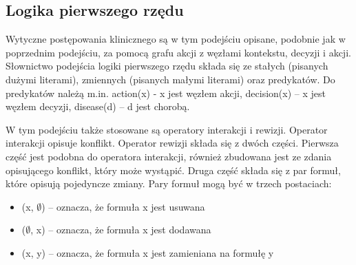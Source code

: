 \subsection{Logika pierwszego rzędu}



Wytyczne postępowania klinicznego są w tym podejściu opisane, podobnie jak w poprzednim podejściu, za pomocą grafu akcji z węzłami kontekstu, decyzji i akcji.\cite{SzWilk} Słownictwo podejścia logiki pierwszego rzędu składa się ze stałych (pisanych dużymi literami), zmiennych (pisanych małymi literami) oraz predykatów. Do predykatów należą m.in. action(x) - x jest węzłem akcji, decision(x) – x jest węzłem decyzji, disease(d) – d jest chorobą.

W tym podejściu także stosowane są operatory interakcji i rewizji. Operator interakcji opisuje konflikt. Operator rewizji składa się z dwóch części. Pierwsza część jest podobna do operatora interakcji, również zbudowana jest ze zdania opisującego konflikt, który może wystąpić. Druga część składa się z par formuł, które opisują pojedyncze zmiany. Pary formuł mogą być w trzech postaciach:
\begin{itemize}
\item{(x, $\emptyset$) – oznacza, że formuła x jest usuwana}
\item{($\emptyset$, x) – oznacza, że formuła x jest dodawana}
\item{(x, y) – oznacza, że formuła x jest zamieniana na formułę y}
\end{itemize}


